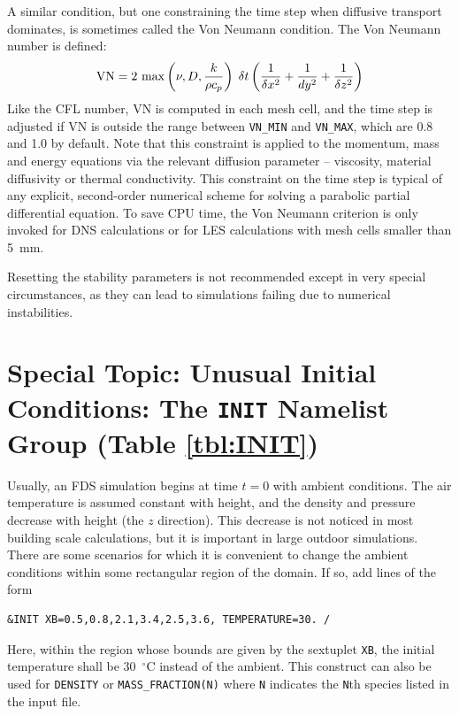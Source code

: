 \documentclass[11pt]{book}
\newcommand{\ct}{\tt\small}
\newcommand{\dx}{\delta x}
\newcommand{\dz}{\delta z}
\newcommand{\dt}{\delta t}
\newcommand{\be}{\begin{equation}}
\newcommand{\ee}{\end{equation}}
\begin{document}
A similar condition, but one constraining the time step when diffusive transport dominates, is sometimes called
the Von Neumann condition. The Von Neumann number is defined:
\be
\hbox{VN} = 2 \, \max \left( \nu , D , \frac{k}{\rho c_p} \right)  \; \dt  \left(\frac{1}{\dx^2}+\frac{1}{dy^2}+\frac{1}{\dz^2} \right)
\ee
Like the CFL number, VN is computed in each mesh cell, and the time step is adjusted if VN is outside the
range between {\ct VN\_MIN} and {\ct VN\_MAX}, which are 0.8 and 1.0 by default.
Note that this constraint is applied to the momentum, mass and energy equations via the
relevant diffusion parameter -- viscosity, material diffusivity or thermal conductivity.
This constraint on the time step is typical
of any explicit, second-order numerical scheme for solving a parabolic partial differential
equation. To save CPU time, the Von Neumann criterion is only invoked for DNS calculations or for LES
calculations with mesh cells smaller than 5~mm.

\begin{warning}
Resetting the stability parameters is not recommended except in very special circumstances, as they can lead to
simulations failing due to numerical instabilities.
\end{warning}


\clearpage


\section{Special Topic: Unusual Initial Conditions: The \texorpdfstring{{\tt INIT}}{INIT} Namelist Group (Table \ref{tbl:INIT})}
\label{info:INIT}

Usually, an FDS simulation begins at time $t=0$ with ambient conditions. The air temperature is
assumed constant with height, and the density and pressure decrease with height (the $z$ direction). This
decrease is not noticed in most building scale calculations, but it is important in large outdoor
simulations. There are some scenarios for which it is convenient to change the ambient conditions within some
rectangular region of the domain. If so, add lines of the form

\footnotesize
\begin{verbatim}
&INIT XB=0.5,0.8,2.1,3.4,2.5,3.6, TEMPERATURE=30. /
\end{verbatim}

\normalsize
Here, within the region whose bounds are given by the sextuplet {\ct XB},
the initial temperature shall be 30~$^\circ$C instead of the ambient.
This construct can also be used for {\ct DENSITY} or
{\ct MASS\_FRACTION(N)} where {\ct N} indicates the {\ct N}th species listed in the input file.
\end{document}
